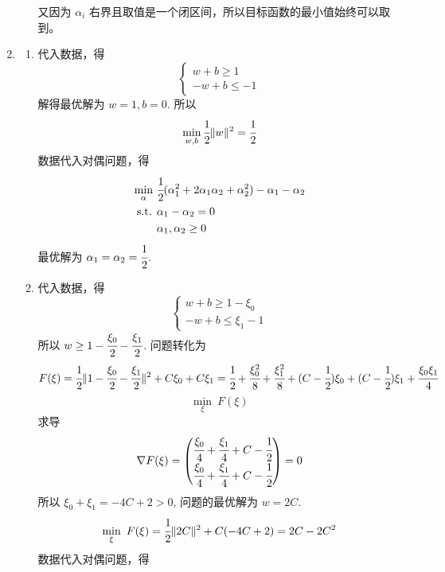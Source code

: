 \documentclass[11pt,letter,notitlepage]{article}
\begin{document}
\begin{solution}
\begin{enumerate}
\begin{enumerate}
			            又因为 $\alpha_i$ 右界且取值是一个闭区间，所以目标函数的最小值始终可以取到。
		      \end{enumerate}
		\item \begin{enumerate}
			      \item 代入数据，得
			            $$\begin{cases}
					            w+b \geq 1 \\
					            -w+b \leq -1
				            \end{cases}$$
			            解得最优解为 $w=1,b=0$. 所以
			            $$\min_{w,b} \cfrac{1}{2}\|w\|^2 =\cfrac{1}{2}$$
			            数据代入对偶问题，得
			            $$\begin{aligned}
					            \min_{\alpha}\  & \cfrac{1}{2}(\alpha_1^2+2\alpha_1 \alpha_2 +\alpha_2^2)-\alpha_1-\alpha_2 \\
					            \mbox{s.t. }    & \alpha_1-\alpha_2=0                                                       \\
					                            & \alpha_1,\alpha_2 \geq 0
				            \end{aligned}$$
			            最优解为 $\alpha_1=\alpha_2=\cfrac{1}{2}$.
			      \item 代入数据，得
			            $$\begin{cases}
					            w+b \geq 1-\xi_0 \\
					            -w+b \leq \xi_1-1
				            \end{cases}$$
			            所以 $w \geq 1-\cfrac{\xi_0}{2}-\cfrac{\xi_1}{2}$. 问题转化为
			            $$F(\xi)=\cfrac{1}{2}\| 1-\cfrac{\xi_0}{2}-\cfrac{\xi_1}{2}\|^2+C\xi_0+C\xi_1
				            =\cfrac{1}{2}+\cfrac{\xi_0^2}{8} + \cfrac{\xi_1^2}{8} +(C-\cfrac{1}{2})\xi_0 +(C-\cfrac{1}{2})\xi_1 +\cfrac{\xi_0\xi_1}{4}$$
			            $$\min_{\xi}\ F(\xi)$$
			            求导
			            $$\nabla F(\xi)=\begin{pmatrix}
					            \cfrac{\xi_0}{4}+\cfrac{\xi_1}{4}+C-\cfrac{1}{2} \\
					            \cfrac{\xi_0}{4}+\cfrac{\xi_1}{4}+C-\cfrac{1}{2} \\
				            \end{pmatrix}=0$$
			            所以 $\xi_0+\xi_1=-4C+2 >0$, 问题的最优解为 $w=2C$.
			            $$\min_{\xi}\ F(\xi)=\cfrac{1}{2}\|2C\|^2+C(-4C+2)=2C-2C^2$$
			            数据代入对偶问题，得
			            $$\begin{aligned}

\end{aligned}$$
\end{enumerate}
\end{enumerate}
\end{solution}
\end{document}
